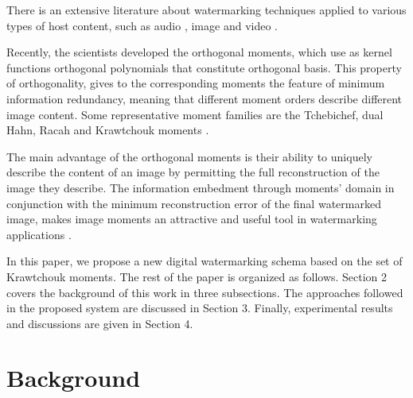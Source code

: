 \documentclass[runningheads]{llncs}
\begin{document}
	There  is  an  extensive literature about watermarking techniques applied to various types of host content, such as audio \cite{Ali2017,Dhar2017}, image \cite{Ghazvini2017,Juarez-sandoval2018,Su2017} and video \cite{sake2018bi}.
	
	Recently, the scientists developed the orthogonal moments, which use as kernel functions orthogonal polynomials that constitute orthogonal basis. This property of orthogonality, gives to the corresponding moments the feature of minimum information redundancy, meaning that different moment orders describe different image content. Some representative moment families are the Tchebichef, dual Hahn, Racah and Krawtchouk moments \cite{papakostas2010computation}.
	
	The main advantage of the orthogonal moments is their ability to uniquely describe the content of an image by permitting the full reconstruction of the image they describe. The information embedment through moments' domain in conjunction with the minimum reconstruction error of the final watermarked image, makes image moments an attractive and useful tool in watermarking applications \cite{Papakostas2014}.
	
	In this paper, we propose a new digital watermarking schema based on the set of Krawtchouk moments. The rest of the paper is organized as follows. Section 2 covers the background of this work in three subsections. The approaches followed in the proposed system are discussed in Section 3. Finally, experimental results and discussions are given in Section 4.
\section{Background}
\end{document}
